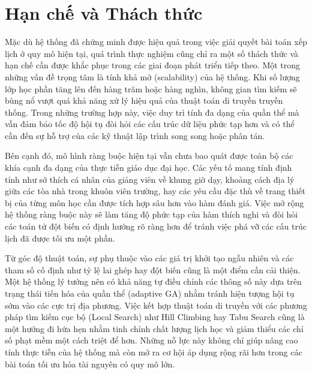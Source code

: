 \section{Hạn chế và Thách thức}

Mặc dù hệ thống đã chứng minh được hiệu quả trong việc giải quyết bài toán xếp lịch ở quy mô hiện tại, quá trình thực nghiệm cũng chỉ ra một số thách thức và hạn chế cần được khắc phục trong các giai đoạn phát triển tiếp theo. Một trong những vấn đề trọng tâm là tính khả mở (scalability) của hệ thống. Khi số lượng lớp học phần tăng lên đến hàng trăm hoặc hàng nghìn, không gian tìm kiếm sẽ bùng nổ vượt quá khả năng xử lý hiệu quả của thuật toán di truyền truyền thống. Trong những trường hợp này, việc duy trì tính đa dạng của quần thể mà vẫn đảm bảo tốc độ hội tụ đòi hỏi các cấu trúc dữ liệu phức tạp hơn và có thể cần đến sự hỗ trợ của các kỹ thuật lập trình song song hoặc phân tán.

Bên cạnh đó, mô hình ràng buộc hiện tại vẫn chưa bao quát được toàn bộ các khía cạnh đa dạng của thực tiễn giáo dục đại học. Các yếu tố mang tính định tính như sở thích cá nhân của giảng viên về khung giờ dạy, khoảng cách địa lý giữa các tòa nhà trong khuôn viên trường, hay các yêu cầu đặc thù về trang thiết bị của từng môn học cần được tích hợp sâu hơn vào hàm đánh giá. Việc mở rộng hệ thống ràng buộc này sẽ làm tăng độ phức tạp của hàm thích nghi và đòi hỏi các toán tử đột biến có định hướng rõ ràng hơn để tránh việc phá vỡ các cấu trúc lịch đã được tối ưu một phần.

Từ góc độ thuật toán, sự phụ thuộc vào các giá trị khởi tạo ngẫu nhiên và các tham số cố định như tỷ lệ lai ghép hay đột biến cũng là một điểm cần cải thiện. Một hệ thống lý tưởng nên có khả năng tự điều chỉnh các thông số này dựa trên trạng thái tiến hóa của quần thể (adaptive GA) nhằm tránh hiện tượng hội tụ sớm vào các cực trị địa phương. Việc kết hợp thuật toán di truyền với các phương pháp tìm kiếm cục bộ (Local Search) như Hill Climbing hay Tabu Search cũng là một hướng đi hứa hẹn nhằm tinh chỉnh chất lượng lịch học và giảm thiểu các chỉ số phạt mềm một cách triệt để hơn. Những nỗ lực này không chỉ giúp nâng cao tính thực tiễn của hệ thống mà còn mở ra cơ hội áp dụng rộng rãi hơn trong các bài toán tối ưu hóa tài nguyên có quy mô lớn.
